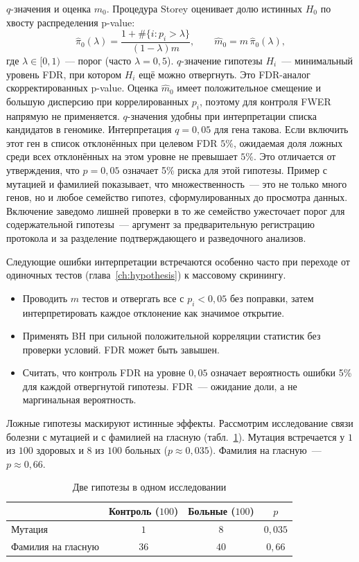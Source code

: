 $q$-значения и оценка $m_0$. Процедура Storey оценивает долю истинных $H_0$ по хвосту распределения p-value:
\[ \hat\pi_0(\lambda)=\frac{1+\#\{i\colon p_i>\lambda\}}{(1-\lambda)m}, \qquad \hat m_0=m\,\hat\pi_0(\lambda),
\]
где $\lambda\in[0,1)$~--- порог (часто $\lambda=0{,}5$).
$q$-значение гипотезы $H_i$~--- минимальный уровень FDR, при котором $H_i$ ещё можно отвергнуть. Это FDR-аналог скорректированных p-value.
Оценка $\hat m_0$ имеет положительное смещение и большую дисперсию при коррелированных $p_i$, поэтому для контроля FWER напрямую не применяется. $q$-значения удобны при интерпретации списка кандидатов в геномике.
Интерпретация $q=0{,}05$ для гена такова. Если включить этот ген в список отклонённых при целевом FDR $5\%$, ожидаемая доля ложных среди всех отклонённых на этом уровне не превышает $5\%$. Это отличается от утверждения, что $p=0{,}05$ означает 5\% риска для этой гипотезы.
Пример с мутацией и фамилией показывает, что множественность~--- это не только много генов, но и любое семейство гипотез, сформулированных до просмотра данных. Включение заведомо лишней проверки в то же семейство ужесточает порог для содержательной гипотезы~--- аргумент за предварительную регистрацию протокола и за разделение подтверждающего и разведочного анализов.

Следующие ошибки интерпретации встречаются особенно часто при переходе от одиночных тестов (глава~\ref{ch:hypothesis}) к массовому скринингу.
\begin{itemize}
    \item Проводить $m$ тестов и отвергать все с $p_i<0{,}05$ без поправки,
          затем интерпретировать каждое отклонение как значимое открытие.
    \item Применять BH при сильной положительной корреляции статистик
          без проверки условий. FDR может быть завышен.
    \item Считать, что контроль FDR на уровне $0{,}05$ означает
          вероятность ошибки 5\% для каждой отвергнутой гипотезы. FDR~--- ожидание доли, а не маргинальная вероятность.
\end{itemize}

Ложные гипотезы маскируют истинные эффекты. Рассмотрим исследование связи болезни с мутацией и с фамилией на гласную (табл.~\ref{tab:mutation}).
Мутация встречается у $1$ из $100$ здоровых и $8$ из $100$ больных ($p\approx 0{,}035$). Фамилия на гласную~--- $p\approx 0{,}66$.

\begin{table}[htbp]
    \centering
    \caption{Две гипотезы в одном исследовании}
    \label{tab:mutation}
    \footnotesize
    \begin{tabularx}{\linewidth}{|>{\raggedright\arraybackslash}X|c|c|c|}
        \hline
        & Контроль ($100$) & Больные ($100$) & $p$ \\
        \hline
        Мутация & $1$ & $8$ & $0{,}035$ \\
        Фамилия на гласную & $36$ & $40$ & $0{,}66$ \\
        \hline
    \end{tabularx}
\end{table}

